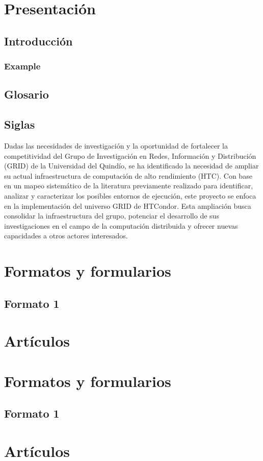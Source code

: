 \section{Presentación}
\subsection{Introducción}
\subsubsection{Example}
\subsection{Glosario}
\subsection{Siglas}

Dadas las necesidades de investigación y la oportunidad de fortalecer la 
competitividad del Grupo de Investigación en Redes, Información y Distribución (GRID)
de la Universidad del Quindío, se ha identificado la necesidad de ampliar su actual 
infraestructura de computación de alto rendimiento (HTC). Con base en un mapeo sistemático
de la literatura previamente realizado para identificar, analizar y caracterizar los posibles 
entornos de ejecución, este proyecto se enfoca en la implementación del universo GRID de HTCondor. 
Esta ampliación busca consolidar la infraestructura del grupo, potenciar el desarrollo 
de sus investigaciones en el campo de la computación distribuida y ofrecer nuevas capacidades
a otros actores interesados.

\appendix

\section{Formatos y formularios}
\subsection{Formato 1}

\section{Artículos}

\appendix

\section{Formatos y formularios}
\subsection{Formato 1}

\section{Artículos}